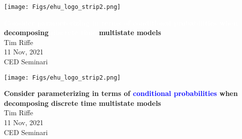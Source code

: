 \documentclass[20pt,usenames,dvipsnames]{beamer}
\newcommand{\white}[1]{\textcolor{white}{#1}}
\newcommand{\blue}[1]{\textcolor{blue}{#1}}
\begin{document}

\begin{frame}[plain]
	\vspace{.5cm}
 \centerline{\texttt{[image: Figs/ehu\_logo\_strip2.png]}}

	\huge
	\vspace{5mm}
	\textbf{\white{Consider parameterizing in terms of conditional probabilities when} decomposing \white{discrete time} multistate models}\\
	\vspace{1em}
	\large 
	Tim Riffe \\
	\vspace{5mm}
	11 Nov, 2021\\
	CED Seminari
\end{frame}

%



\begin{frame}[plain]
	\vspace{.5cm}
 \centerline{\texttt{[image: Figs/ehu\_logo\_strip2.png]}}

	\huge
	\vspace{5mm}
	
	\textbf{Consider parameterizing in terms of \blue{conditional probabilities} when decomposing discrete time multistate models}\\
	\vspace{1em}
	\large 
	Tim Riffe \\
	\vspace{5mm}
	11 Nov, 2021\\
	CED Seminari
\end{frame}
\end{document}
